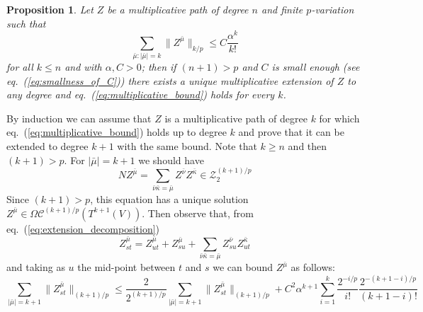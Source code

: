 \documentclass[a4paper,12pt,reqno]{amsproc}
\newcommand{\NN}{N}
\newcommand{\ZZ}{\mathcal{Z}}
\newcommand{\OCC}{\Omega \mathcal{C}}
\newcommand{\norm}[1]{\lVert #1\rVert}
\newtheorem{proposition}{Proposition}
\begin{document}
\begin{proposition}
Let $Z$ be a multiplicative path of degree $n$ and finite $p$-variation such that
\begin{equation}
  \label{eq:multiplicative_bound}
 \sum_{\bar\mu : |\bar\mu|=k}\norm{Z^{\bar\mu}}_{k/p} \le C \frac{\alpha^{k}}{k!} 
\end{equation}
for all $k \le n$ and with $\alpha,C >0$; then if $(n+1) > p$ and $C$
is small enough (see eq.~(\ref{eq:smallness_of_C})) there exists a unique
multiplicative extension of $Z$ to any degree and
eq.~(\ref{eq:multiplicative_bound}) holds for every $k$.
\end{proposition}
\proof
By induction we can assume that $Z$ is a multiplicative path of degree
$k$ for which eq.~(\ref{eq:multiplicative_bound}) holds up to degree
$k$ and prove that it can be extended to degree $k+1$ with the same
bound. Note that $k \ge n$ and then $(k+1) > p$.
For $|\bar\mu|=k+1$ we should have
\begin{equation}
\label{eq:extension_decomposition}
  \NN Z^{\bar\mu} = \sum_{\bar\nu\bar \kappa = \bar\mu} Z^{\bar\nu}
  Z^{\bar\kappa} \in \ZZ_2^{(k+1)/p}
\end{equation}
Since $(k+1) > p$, this equation has a unique solution $Z^{\bar\mu}
\in \OCC^{(k+1)/p}(T^{k+1}(V))$.
Then observe
that, from eq.~(\ref{eq:extension_decomposition})
$$
 Z^{\bar\mu}_{st} = Z^{\bar\mu}_{ut} + Z^{\bar\mu}_{su} + \sum_{\bar\nu\bar \kappa = \bar\mu} Z^{\bar\nu}_{su}
  Z^{\bar\kappa}_{ut} 
$$
and taking as $u$ the mid-point between $t$ and $s$ we can bound
$Z^{\bar \mu}$ as
follows:
\begin{equation*}
  \sum_{|\bar\mu| = k+1} \norm{Z^{\bar\mu}_{st}}_{(k+1)/p} \le
  \frac{2}{2^{(k+1)/p}} \sum_{|\bar\mu| = k+1}
  \norm{Z^{\bar\mu}_{st}}_{(k+1)/p} +C^2 \alpha^{k+1}
\sum_{i=1}^k 
\frac{2^{-i/p}}{i!} \frac{2^{-(k+1-i)/p}}{(k+1-i)!} 
\end{equation*}
\end{document}
